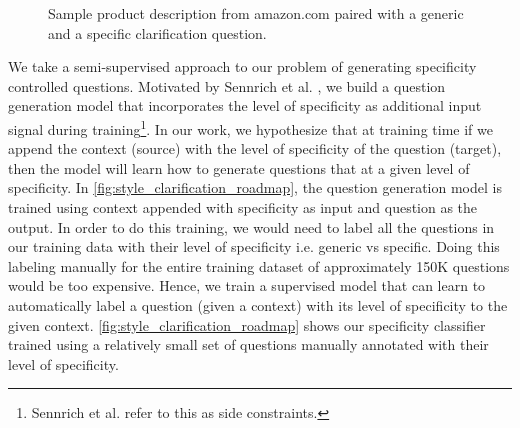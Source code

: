 \documentclass[11pt,a4paper]{article}
\begin{document}
\begin{figure}[h]
    \caption{Sample product description from amazon.com paired with a generic and a specific clarification question.}\label{fig:amazon_style_cqa}
\end{figure}

We take a semi-supervised approach to our problem of generating specificity controlled questions. Motivated by Sennrich et al. \cite{sennrich2016controlling}, we build a question generation model that incorporates the level of specificity as additional input signal during training\footnote{Sennrich et al. \cite{sennrich2016controlling} refer to this as side constraints.}. In our work, we hypothesize that at training time if we append the context (source) with the level of specificity of the question (target), then the model will learn how to generate questions that at a given level of specificity. In \autoref{fig:style_clarification_roadmap}, the question generation model is trained using context appended with specificity as input and question as the output. In order to do this training, we would need to label all the questions in our training data with their level of specificity i.e. generic vs specific. Doing this labeling manually for the entire training dataset of approximately 150K questions would be too expensive. Hence, we train a supervised model that can learn to automatically label a question (given a context) with its level of specificity to the given context. \autoref{fig:style_clarification_roadmap} shows our specificity classifier trained using a relatively small set of questions manually annotated with their level of specificity. 
\end{document}
